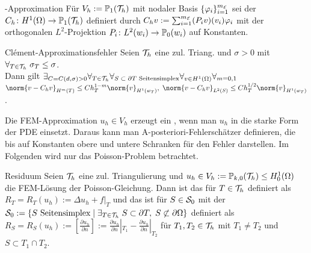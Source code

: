 \begin{Def}{-Approximation}
    Für $V_h := \PP_1(\T_h)$ mit nodaler Basis $\{\varphi_i\}_{i=1}^{m_\E}$ sei der\\
     $C_h\colon H^1(\Omega) \to \PP_1(\T_h)$ definiert
    durch $C_h v := \sum_{i=1}^{m_\E} (P_i v)(v_i) \varphi_i$ mit
    der orthogonalen $L^2$-Projektion $P_i\colon L^2(w_i) \to \PP_0(w_i)$ auf Konstanten.
\end{Def}

\begin{Satz}{Clément-Approximationsfehler}
    Seien $\T_h$ eine zul. Triang. und $\sigma > 0$ mit
    $\forall_{T \in \T_h}\; \sigma_T \le \sigma$.\\
    Dann gilt $\exists_{C = C(d, \sigma) > 0} \forall_{T \in \T_h}
    \forall_{\text{$S \subset \partial T$ Seitensimplex}} \forall_{v \in H^1(\Omega)}
    \forall_{m = 0, 1}$\\
    $\norm{v - C_h v}_{H^m(T)} \le Ch_T^{1-m} \norm{v}_{H^1(w_T)},\;
    \norm{v - C_h v}_{L^2(S)} \le Ch_T^{1/2} \norm{v}_{H^1(w_T)}$.
\end{Satz}

\linie

\begin{Bem}
    Die FEM-Approximation $u_h \in V_h$ erzeugt ein ,
    wenn man $u_h$ in die starke Form der PDE einsetzt.
    Daraus kann man A-posteriori-Fehlerschätzer definieren, die
    bis auf Konstanten obere und untere Schranken für den Fehler darstellen.
    Im Folgenden wird nur das Poisson-Problem betrachtet.
\end{Bem}

\begin{Def}{Residuum}
    Seien $\T_h$ eine zul. Triangulierung und
    $u_h \in V_h := \PP_{k,0}(\T_h) \le H^1_0(\Omega)$ die
    FEM-Lösung der Poisson-Gleichung.
    Dann ist das  für $T \in \T_h$ definiert als
    $R_T = R_T(u_h) := \Delta u_h + f|_T$
    und das 
    ist für $S \in \S_0$  mit der 
    $\S_0 := \{\text{$S$ Seitensimplex} \;|\;
    \exists_{T \in \T_h}\; S \subset \partial T,\; S \not\subset \partial\Omega\}$
    definiert als
    $R_S = R_S(u_h) := [\frac{\partial u_h}{\partial n}] :=
    \frac{\partial u_h}{\partial n}|_{T_1} - \frac{\partial u_h}{\partial n}|_{T_2}$
    für $T_1, T_2 \in \T_h$ mit $T_1 \not= T_2$ und $S \subset T_1 \cap T_2$.
\end{Def}


